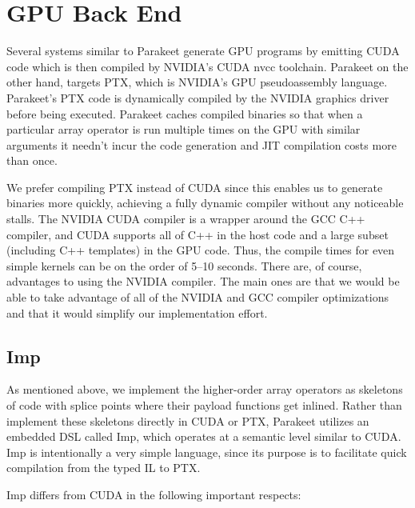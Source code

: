 \documentclass[10pt,twocolumn]{article}
\begin{document}
\section{GPU Back End}
Several systems similar to Parakeet \cite{Cata11,Chaf11} generate GPU programs by emitting CUDA code which is then compiled by NVIDIA's CUDA nvcc toolchain. Parakeet on the other hand, targets PTX, which is NVIDIA's GPU pseudoassembly language. Parakeet's PTX code is dynamically compiled by the NVIDIA graphics driver before being executed.  Parakeet caches compiled binaries so that when a particular array operator is run multiple times on the GPU with similar arguments it needn't incur the code generation and JIT compilation costs more than once.

We prefer compiling PTX instead of CUDA since this enables us to generate binaries more quickly, achieving a fully dynamic compiler without any noticeable stalls. The NVIDIA CUDA compiler is a wrapper around the GCC C++ compiler, and CUDA supports all of C++ in the host code and a large subset (including C++ templates) in the GPU code.  Thus, the compile times for even simple kernels can be on the order of 5--10 seconds.  There are, of course, advantages to using the NVIDIA compiler. The main ones are that we would be able to take advantage of all of the NVIDIA and GCC compiler optimizations and that it would simplify our implementation effort.  

\subsection{Imp}
\label{Imp}
As mentioned above, we implement the higher-order array operators as skeletons of code with splice points where their payload functions get inlined.  Rather than implement these skeletons directly in CUDA or PTX, Parakeet utilizes an embedded DSL called Imp, which operates at a semantic level similar to CUDA. Imp is intentionally a very simple language, since its purpose is to facilitate quick compilation from the typed IL to PTX. 

Imp differs from CUDA in the following important respects:
\end{document}
